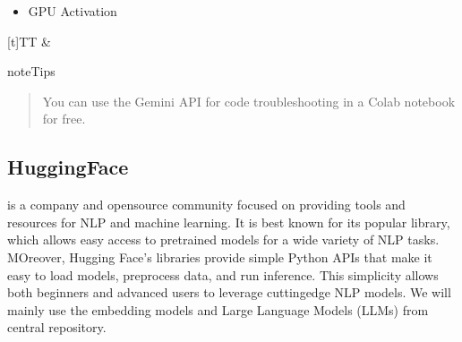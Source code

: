\documentclass[letterpaper,11pt,english]{sphinxmanual}
\begin{document}
\begin{itemize}
\item {} 
\sphinxAtStartPar
GPU Activation

\end{itemize}


\begin{savenotes}\sphinxattablestart
\sphinxthistablewithglobalstyle
\sphinxthistablewithborderlessstyle
\centering
\begin{tabulary}{\linewidth}[t]{TT}
\sphinxtoprule
\sphinxtableatstartofbodyhook
\noindent{}
&
\noindent{}
\\
\sphinxbottomrule
\end{tabulary}
\sphinxtableafterendhook\par
\sphinxattableend\end{savenotes}

\begin{sphinxadmonition}{note}{Tips}
\begin{quote}

\sphinxAtStartPar
You can use the Gemini API for code troubleshooting in a Colab notebook for free.
\end{quote}

\begin{figure}[H]
\centering

\noindent{}
\end{figure}
\end{sphinxadmonition}


\subsection{HuggingFace}
\label{\detokenize{prelim:huggingface}}
\sphinxAtStartPar
{} is a company and open\sphinxhyphen{}source community focused on providing tools and resources for NLP
and machine learning. It is best known for its popular  library, which allows easy access
to pre\sphinxhyphen{}trained models for a wide variety of NLP tasks. MOreover,  Hugging Face’s libraries provide simple
Python APIs that make it easy to load models, preprocess data, and run inference. This simplicity allows
both beginners and advanced users to leverage cutting\sphinxhyphen{}edge NLP models. We will mainly use the embedding models
and Large Language Models (LLMs) from  central repository.
\end{document}
